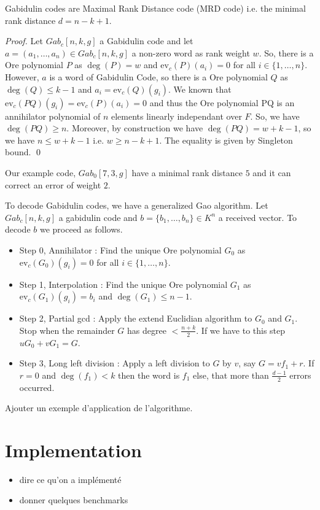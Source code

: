 \documentclass[a4paper]{llncs}
\def\todo#1{{\color{todo} #1}}
\newcommand{\ev}[1]{\textrm{ev}_{#1}}
\begin{document}
\begin{proposition}
Gabidulin codes are Maximal Rank Distance code (MRD code) i.e. the minimal rank distance $d = n-k+1$.
\end{proposition}


\begin{proof}
Let $Gab_c[n,k,g]$ a Gabidulin code and let $a = (a_1, \dots, a_n) \in Gab_c[n,k,g]$ a non-zero word as rank weight $w$. So, there is a Ore polynomial $P$ as $\deg(P) = w$ and $\ev{c}(P)(a_i) = 0$ for all $i \in \{1, \dots, n\}$. However, $a$ is a word of Gabidulin Code, so there is a Ore polynomial $Q$ as $\deg(Q) \leqslant k-1$ and $a_i = \ev{c}(Q)(g_i)$. We known that $\ev{c}(PQ)(g_i) = \ev{c}(P)(a_i) = 0$ and thus the Ore polynomial PQ is an annihilator polynomial of $n$ elements linearly independant over $F$. So, we have $\deg(PQ) \geqslant n$. Moreover, by construction we have $\deg(PQ) = w + k -1$, so we have $n \leqslant w+k-1$ i.e. $w \geqslant n-k+1$. The equality is given by Singleton bound. \qed
\end{proof}

\begin{example}
Our example code, $Gab_0[7,3,g]$ have a minimal rank distance $5$ and it can correct an error of weight $2$. 
\end{example}

To decode Gabidulin codes, we have a generalized Gao algorithm. Let $Gab_c[n,k,g]$ a gabidulin code and $b = \{b_1, \dots, b_n\} \in K^n$ a received vector. To decode $b$ we proceed as follows.

\begin{itemize}
\item Step 0, Annihilator : Find the unique Ore polynomial $G_0$ as $\ev{c}(G_0)(g_i) = 0$ for all $i \in \{1, \dots, n\}$.
\item Step 1, Interpolation : Find the unique Ore polynomial $G_1$ as $\ev{c}(G_1)(g_i) = b_i$ and $\deg(G_1) \leqslant n-1$.
\item Step 2, Partial gcd : Apply the extend Euclidian algorithm to $G_0$ and $G_1$. Stop when the remainder $G$ has degree $< \frac{n+k}{2}$. If we have to this step $uG_0 + vG_1 = G$.
\item Step 3, Long left division : Apply a left division to $G$ by $v$, say $G = vf_1 + r$. If $r =0$ and $\deg(f_1) < k$ then the word is $f_1$ else, that more than $\frac{d-1}{2}$ errors occurred. 
\end{itemize}


\todo{Ajouter un exemple d'application de l'algorithme.}

\section{Implementation}

\todo{\begin{itemize}
\item dire ce qu'on a implémenté
\item donner quelques benchmarks
\end{itemize}}
\end{document}

